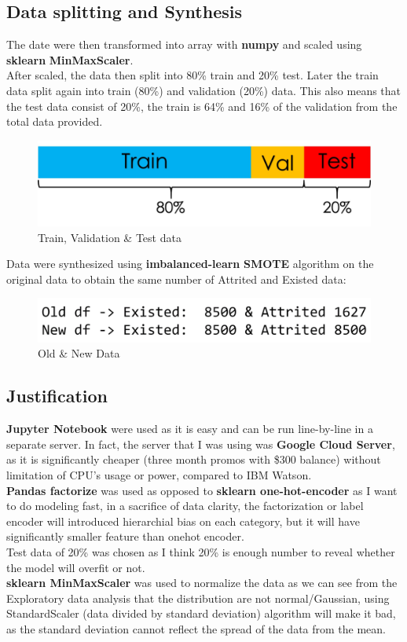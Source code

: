 \documentclass{homeworg}
\begin{document}
\subsection{Data splitting and Synthesis}
The date were then transformed into array with \textbf{numpy} and scaled using \textbf{sklearn} \textbf{MinMaxScaler}.\\
After scaled, the data then split into 80\% train and 20\% test. Later the train data split again into train (80\%) and validation (20\%) data. This also means that the test data consist of 20\%, the train is 64\% and 16\% of the validation from the total data provided.\\
\begin{figure}[H]
    \centering
    \includegraphics[scale=0.4]{figure/traintest.jpg}
    \caption{Train, Validation \& Test data}
    \label{fig:traintest}
\end{figure}
\par
Data were synthesized using \textbf{imbalanced-learn} \textbf{SMOTE} algorithm on the original data to obtain the same number of Attrited and Existed data:
\begin{figure}[H]
    \centering
    \includegraphics[scale=0.5]{figure/SMOTE.png}
    \caption{Old \& New Data}
    \label{fig:oldnewdata}
\end{figure}

\subsection{Justification}
\textbf{Jupyter Notebook} were used as it is easy and can be run line-by-line in a separate server. In fact, the server that I was using was \textbf{Google Cloud Server}, as it is significantly cheaper (three month promos with \$300 balance) without limitation of CPU's usage or power, compared to IBM Watson.\\
\textbf{Pandas factorize} was used as opposed to \textbf{sklearn one-hot-encoder} as I want to do modeling fast, in a sacrifice of data clarity, the factorization or label encoder will introduced hierarchial bias on each category, but it will have significantly smaller feature than onehot encoder.\\
Test data of 20\% was chosen as I think 20\% is enough number to reveal whether the model will overfit or not.\\
\textbf{sklearn MinMaxScaler} was used to normalize the data as we can see from the Exploratory data analysis that the distribution are not normal/Gaussian, using StandardScaler (data divided by standard deviation) algorithm will make it bad, as the standard deviation cannot reflect the spread of the data from the mean.
\end{document}
